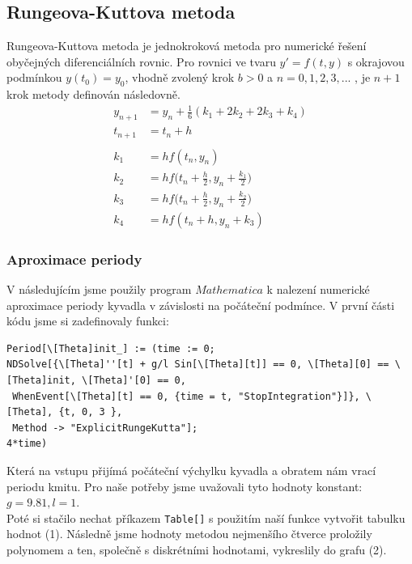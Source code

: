 \documentclass[reqno, a4paper]{amsart}
\begin{document}
\clearpage
\subsection{Rungeova-Kuttova metoda}
\label{sec:Rungeova-Kuttova metoda}

Rungeova-Kuttova metoda je jednokroková metoda pro numerické řešení obyčejných diferenciálních rovnic. Pro rovnici ve tvaru \( y'= f(t,y)\) s okrajovou podmínkou \(y(t_0)=y_0 \), vhodně zvolený krok \(b>0\) a \(n = 0, 1, 2, 3, ...\) , je $n+1$ krok metody definován následovně.
\begin{align*}
y_{n+1} &= y_n + \frac{1}{6} (k_1 + 2k_2 +2k_3 +k_4) \\
t_{n+1} &= t_n +h \\ \\
k_1 &= h f(t_n,y_n) \\
k_2 &= h f\Big(t_n + \frac{h}{2},y_n + \frac{k_1}{2}\Big) \\
k_3 &= h f\Big(t_n + \frac{h}{2},y_n + \frac{k_2}{2}\Big) \\
k_4 &= h f(t_n + h ,y_n + k_3) 
\end{align*}

\subsubsection{Aproximace periody}
\label{sec:aprox-periody}
V následujícím jsme použily program $Mathematica$ k nalezení numerické aproximace periody kyvadla v závislosti na počáteční podmínce.
V první části kódu jsme si zadefinovaly funkci:
\begin{verbatim}
Period[\[Theta]init_] := (time := 0; 
NDSolve[{\[Theta]''[t] + g/l Sin[\[Theta][t]] == 0, \[Theta][0] == \[Theta]init, \[Theta]'[0] == 0, 
 WhenEvent[\[Theta][t] == 0, {time = t, "StopIntegration"}]}, \[Theta], {t, 0, 3 },
 Method -> "ExplicitRungeKutta"];
4*time)
\end{verbatim}
Která na vstupu přijímá počáteční výchylku kyvadla a obratem nám vrací periodu kmitu. Pro naše potřeby jsme uvažovali tyto hodnoty konstant: $g=9.81, l=1$.\\
Poté si stačilo nechat příkazem \verb|Table[]| s použitím naší funkce vytvořit tabulku hodnot (1). Následně jsme hodnoty metodou nejmenšího čtverce proložily polynomem a ten, společně s diskrétními hodnotami, vykreslily do grafu (2). 
\end{document}
